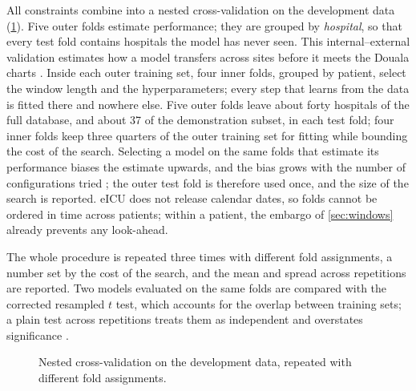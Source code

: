 All constraints combine into a nested cross-validation on the development data (\cref{fig:nested-cv}). Five outer folds estimate performance; they are grouped by \emph{hospital}, so that every test fold contains hospitals the model has never seen. This internal--external validation estimates how a model transfers across sites before it meets the Douala charts \parencite{steyerberg2016}. Inside each outer training set, four inner folds, grouped by patient, select the window length and the hyperparameters; every step that learns from the data is fitted there and nowhere else. Five outer folds leave about forty hospitals of the full database, and about 37 of the demonstration subset, in each test fold; four inner folds keep three quarters of the outer training set for fitting while bounding the cost of the search. Selecting a model on the same folds that estimate its performance biases the estimate upwards, and the bias grows with the number of configurations tried \parencite{cawley2010}; the outer test fold is therefore used once, and the size of the search is reported. eICU does not release calendar dates, so folds cannot be ordered in time across patients; within a patient, the embargo of \cref{sec:windows} already prevents any look-ahead.

The whole procedure is repeated three times with different fold assignments, a number set by the cost of the search, and the mean and spread across repetitions are reported. Two models evaluated on the same folds are compared with the corrected resampled $t$ test, which accounts for the overlap between training sets; a plain test across repetitions treats them as independent and overstates significance \parencite{nadeau2003}.

\begin{figure}[htbp]
\centering
{}
\caption{Nested cross-validation on the development data, repeated with different fold assignments.}\label{fig:nested-cv}
\end{figure}

